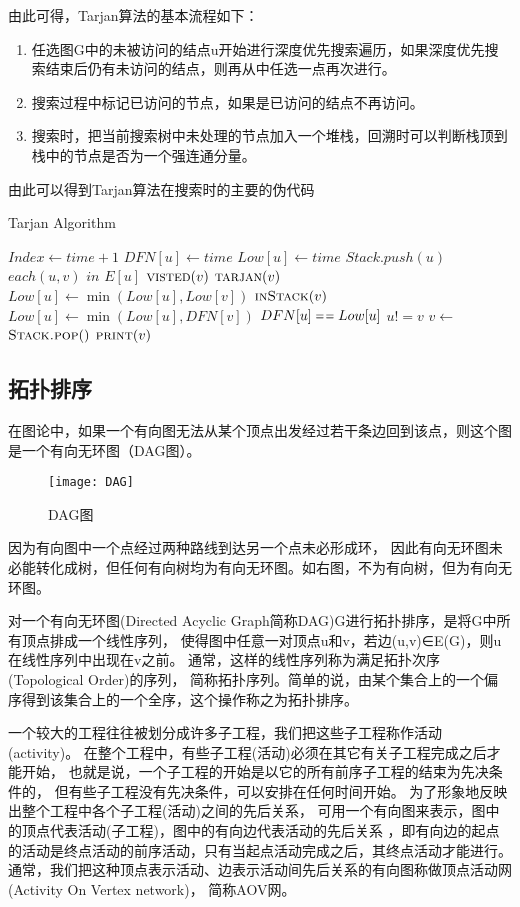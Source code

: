 由此可得，Tarjan算法的基本流程如下：
\begin{enumerate}
\item 任选图G中的未被访问的结点u开始进行深度优先搜索遍历，如果深度优先搜索结束后仍有未访问的结点，则再从中任选一点再次进行。
\item 搜索过程中标记已访问的节点，如果是已访问的结点不再访问。
\item 搜索时，把当前搜索树中未处理的节点加入一个堆栈，回溯时可以判断栈顶到栈中的节点是否为一个强连通分量。
\end{enumerate}

由此可以得到Tarjan算法在搜索时的主要的伪代码
\begin{algorithm} 
\caption {Tarjan Algorithm} 
\begin{codebox}
\li	$Index \leftarrow time + 1$
\li	$DFN[u] \leftarrow time$
\li	$Low[u] \leftarrow time$
\li	$Stack.push(u)$
\li	\For $each (u, v)$ $in$ $E[u]$
\li		\Do  \If $\textnormal{\scshape visted}(v)$
\li			\Then
				$\textnormal{\scshape tarjan}(v)$                  
\li            			$Low[u] \leftarrow \min(Low[u], Low[v])$
\li        		 \ElseIf $\textnormal{\scshape inStack}(v)$ 
\li            			\Then $Low[u] \leftarrow \min(Low[u], DFN[v])$
			\End
		\End
\li	\If $DFN[u] \isequal Low[u]$
\li		\Then \While $u != v$
\li				\Do $v \leftarrow$ $\textnormal{\scshape Stack.pop}()$                  
\li            				$\textnormal{\scshape print}(v)$
				\End 
		\End
\end{codebox}
\end{algorithm} 

\subsection{拓扑排序}
在图论中，如果一个有向图无法从某个顶点出发经过若干条边回到该点，则这个图是一个有向无环图（DAG图）。
\begin{figure}[htbp]
\centering\texttt{[image: DAG]}
\caption{DAG图}\label{fig:DAG}
\end{figure}
因为有向图中一个点经过两种路线到达另一个点未必形成环，
因此有向无环图未必能转化成树，但任何有向树均为有向无环图。如右图，不为有向树，但为有向无环图。

对一个有向无环图(Directed Acyclic Graph简称DAG)G进行拓扑排序，是将G中所有顶点排成一个线性序列，
使得图中任意一对顶点u和v，若边(u,v)∈E(G)，则u在线性序列中出现在v之前。
通常，这样的线性序列称为满足拓扑次序(Topological Order)的序列，
简称拓扑序列。简单的说，由某个集合上的一个偏序得到该集合上的一个全序，这个操作称之为拓扑排序。

一个较大的工程往往被划分成许多子工程，我们把这些子工程称作活动(activity)。
在整个工程中，有些子工程(活动)必须在其它有关子工程完成之后才能开始，
也就是说，一个子工程的开始是以它的所有前序子工程的结束为先决条件的，
但有些子工程没有先决条件，可以安排在任何时间开始。
为了形象地反映出整个工程中各个子工程(活动)之间的先后关系，
可用一个有向图来表示，图中的顶点代表活动(子工程)，图中的有向边代表活动的先后关系
，即有向边的起点的活动是终点活动的前序活动，只有当起点活动完成之后，其终点活动才能进行。
通常，我们把这种顶点表示活动、边表示活动间先后关系的有向图称做顶点活动网(Activity On Vertex network)，
简称AOV网。

